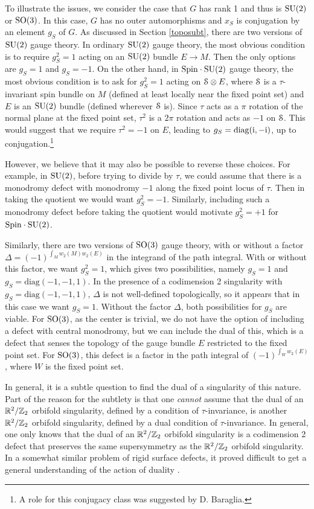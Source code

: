 \documentclass[11pt,a4paper]{article}
\begin{document}
To illustrate the issues, we consider the case that $G$ has rank 1 and thus is ${\mathrm{SU}}(2)$ or ${\mathrm{SO}}(3)$. 
In this case, $G$ has no outer automorphisms and $x_S$ is conjugation by an element
$g_S$ of $G$.
As discussed in Section \ref{toposubt}, there
 are two versions of ${\mathrm{SU}}(2)$ gauge theory.  In ordinary ${\mathrm{SU}}(2)$
gauge theory, the most obvious condition is to require $g_S^2=1$ acting on an ${\mathrm{SU}}(2)$ bundle $E\to M$.   Then the  only options are $g_S=1$ and $g_S=-1$. 
On the other hand, in
${\mathrm{Spin}}\cdot {\mathrm{SU}}(2)$ gauge theory, the most obvious condition is to ask for 
$g_S^2=1$ acting on ${\mathcal S}\otimes E$, where ${\mathcal S}$ is a $\tau$-invariant spin bundle on $M$ (defined
at least locally near the fixed point set) and $E$ is an ${\mathrm{SU}}(2)$ bundle (defined wherever ${\mathcal S}$ is).   Since $\tau$ acts as a $\pi$ rotation of the normal plane at the fixed 
point set, $\tau^2$ is a $2\pi$ rotation and acts as $-1$ on ${\mathcal S}$.   This would suggest that we require
 $\tau^2=-1$ on $E$, leading to $g_S=\mathrm{diag}({\mathrm i},-{\mathrm i})$,
up to conjugation.\footnote{A role for this conjugacy class was suggested by D. Baraglia.} 

However, we believe that it may also be possible to reverse these choices.    For example, in ${\mathrm{SU}}(2)$, before trying to divide by $\tau$, we could assume
that there is a monodromy defect with monodromy $-1$ along the fixed point locus of $\tau$.  Then in taking the quotient we would want $g_S^2=-1$.
Similarly, including such a monodromy defect before taking the quotient would motivate $g_S^2=+1$ for ${\mathrm{Spin}}\cdot {\mathrm{SU}}(2)$.


Similarly,  there are two versions of ${\mathrm{SO}}(3)$ gauge theory, with or without a factor 
$\Delta=(-1)^{\int_M w_2(M) w_2(E)}$ in the integrand of the path integral.    With or without this factor, we want $g_S^2=1$, which gives two
possibilities, namely $g_S=1$ and $g_S=\mathrm{diag}(-1,-1,1)$.   In the presence of a codimension 2 singularity with $g_S=\mathrm{diag}(-1,-1,1)$,
$\Delta$ is not well-defined topologically, so it appears that in this case we want $g_S=1$.   Without the factor $\Delta$, both possibilities for $g_S$ are viable.
For ${\mathrm{SO}}(3)$, as the center is trivial, we do not have the option of including a defect with central monodromy, but we can include the dual of this, which is
a defect that senses the topology of the gauge bundle $E$ restricted to the fixed point set.  For ${\mathrm{SO}}(3)$, this defect is a factor in the path integral of 
$(-1)^{\int_W  w_2(E)}$, where $W$ is the fixed point set.

In general, it is a subtle question to find the dual of a singularity of this nature.  Part of the reason for the subtlety is that one {\it cannot} assume
that the dual of an ${\mathbb{R}}^2/{\mathbb Z}_2$ orbifold singularity, defined by a condition of $\tau$-invariance, is another ${\mathbb{R}}^2/{\mathbb Z}_2$
orbifold singularity, defined by a dual condition of $\tau$-invariance.   In general, one only knows that the
dual of an ${\mathbb{R}}^2/{\mathbb Z}_2$ orbifold singularity is a codimension 2 defect that preserves the same supersymmetry as the ${\mathbb{R}}^2/{\mathbb Z}_2$ orbifold singularity.
    In a somewhat similar problem of rigid surface defects, it proved difficult to get a general understanding of the action
of duality \cite{GWr}.
\end{document}
